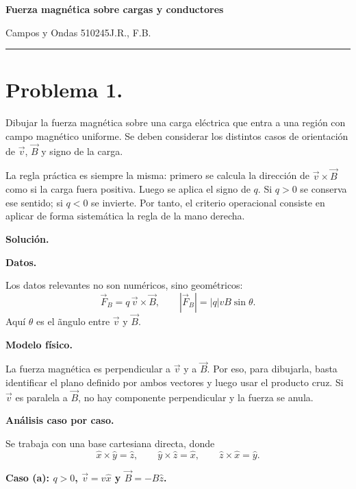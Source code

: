 \documentclass[11pt]{article}
\newcommand{\encabezado}[3]{%
{\Large\bfseries #1\par}
\vspace{2pt}
{\normalsize #2\hfill #3\par}
\vspace{6pt}\hrule\vspace{8pt}}
\newcommand{\soluciontitulo}{%
  \par\medskip
  \noindent\textbf{Solución.}\par
  \smallskip
}
\begin{document}
\encabezado{Fuerza magnética sobre cargas y conductores}{Campos y Ondas 510245}{J.R., F.B.}
\shorthandoff{<>}


\section*{Problema 1.}
Dibujar la fuerza magn\'etica sobre una carga el\'ectrica que entra a una regi\'on con campo magn\'etico uniforme. Se deben considerar los distintos casos de orientaci\'on de $\vec v$, $\vec B$ y signo de la carga.

\par\medskip\noindent La regla pr\'actica es siempre la misma: primero se calcula la direcci\'on de $\vec v\times\vec B$ como si la carga fuera positiva. Luego se aplica el signo de $q$. Si $q>0$ se conserva ese sentido; si $q<0$ se invierte. Por tanto, el criterio operacional consiste en aplicar de forma sistemática la regla de la mano derecha.\par\medskip 

\soluciontitulo

\par\medskip\noindent\textbf{Datos.}\par\smallskip
Los datos relevantes no son num\'ericos, sino geom\'etricos:
\begin{equation*}
    \vec F_B=q\,\vec v\times\vec B,
    \qquad
    |\vec F_B|=|q|vB\sin\theta.
\end{equation*}
Aqu\'i $\theta$ es el \~angulo entre $\vec v$ y $\vec B$.

\par\medskip\noindent\textbf{Modelo físico.}\par\smallskip
La fuerza magn\'etica es perpendicular a $\vec v$ y a $\vec B$. Por eso, para dibujarla, basta identificar el plano definido por ambos vectores y luego usar el producto cruz. Si $\vec v$ es paralela a $\vec B$, no hay componente perpendicular y la fuerza se anula.

\par\medskip\noindent\textbf{Análisis caso por caso.}\par\smallskip
Se trabaja con una base cartesiana directa, donde
\begin{equation*}
    \hat x\times\hat y=\hat z,
    \qquad
    \hat y\times\hat z=\hat x,
    \qquad
    \hat z\times\hat x=\hat y.
\end{equation*}

\textbf{Caso (a): $q>0$, $\vec v=v\hat x$ y $\vec B=-B\hat z$.}
\end{document}
